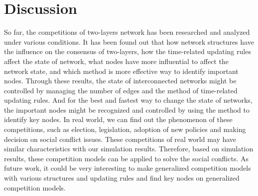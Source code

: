 \section{Discussion} 
So far, the competitions of two-layers network has been researched and analyzed under various conditions. It has been found out that how network structures have the influence on the consensus of two-layers, how the time-related updating rules affect the state of network, what nodes have more influential to affect the network state, and which method is more effective way to identify important nodes. Through these results, the state of interconnected networks might be controlled by managing the number of edges and the method of time-related updating rules. And for the best and fastest way to change the state of networks, the important nodes might be recognized and controlled by using the method to identify key nodes.
In real world, we can find out the phenomenon of these competitions, such as election, legislation, adoption of new policies and making decision on social conflict issues. These competitions of real world may have similar characteristics with our simulation results. Therefore, based on simulation results, these competition models can be applied to solve the social conflicts. As future work, it could be very interesting to make generalized competition models with various structures and updating rules and find key nodes on generalized competition models.   
